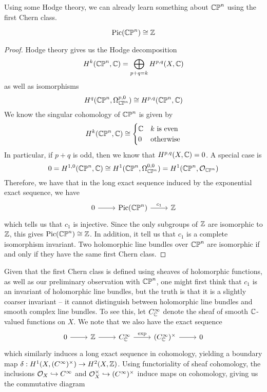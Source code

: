 Using some Hodge theory, we can already learn something about $\mathbb{CP}^n$ using the
first Chern class.
%
\begin{thm}
\[
\mathrm{Pic}(\mathbb{CP}^n) \cong \mathbb{Z}
\]
\end{thm}
%
\begin{proof}
Hodge theory gives us the Hodge decomposition
\[
H^k(\mathbb{CP}^n, \mathbb{C}) = \bigoplus_{p+q=k} H^{p,q}(X, \mathbb{C})
\]
as well as isomorphisms
\[
H^q(\mathbb{CP}^n, \Omega^{p,0}_{\mathbb{CP}^n}) \cong H^{p,q}(\mathbb{CP}^n, \mathbb{C})
\]
We know the singular cohomology of $\mathbb{CP}^n$ is given by
\[
H^k(\mathbb{CP}^n, \mathbb{C}) \cong \begin{cases}
\mathbb{C} & k \text{ is even} \\
0 & \text{otherwise}
\end{cases}
\]
In particular, if $p+q$ is odd, then we know that $H^{p,q}(X,\mathbb{C}) = 0$.
A special case is
\[
0 = H^{1,0}(\mathbb{CP}^n, \mathbb{C}) \cong H^1(\mathbb{CP}^n, \Omega^{0,0}_{\mathbb{CP}^n}) = H^1(\mathbb{CP}^n, \mathcal{O}_{\mathbb{CP}^n})
\]
Therefore, we have that in the long exact sequence induced by the exponential exact
sequence, we have
\[\begin{tikzcd}
0 \ar[r] & \mathrm{Pic}(\CP^n) \ar[r, "c_1"] & \Z
\end{tikzcd}\]
which tells us that $c_1$ is injective. Since the only subgroups of $\mathbb{Z}$
are isomorphic to $\mathbb{Z}$, this gives $\mathrm{Pic}(\mathbb{CP}^n) \cong \mathbb{Z}$. In addition,
it tell us that $c_1$ is a complete isomorphism invariant. Two holomorphic line bundles
over $\mathbb{CP}^n$ are isomorphic if and only if they have the same first Chern class.
\end{proof}
%
Given that the first Chern class is defined using sheaves of holomorphic functions,
as well as our preliminary observation with $\mathbb{CP}^n$, one might first think that $c_1$ is
an invariant of holomorphic line bundles, but the truth is that it is a slightly coarser
invariant -- it cannot distinguish between holomorphic line bundles and smooth complex
line bundles. To see this, let $C^\infty_{\mathbb{C}}$ denote the sheaf of smooth $\mathbb{C}$-valued
functions on $X$. We note that we also have the exact sequence
\[\begin{tikzcd}
0 \ar[r] & \Z \ar[r] & C_\C^\infty \ar[r, "\mathrm{exp}"] & (C_\C^\infty)^\times \ar[r] & 0
\end{tikzcd}\]
which similarly induces a long exact sequence in cohomology, yielding a boundary
map $\delta : H^1(X, (C^\infty)^\times) \to H^2(X, \mathbb{Z})$. Using functoriality
of sheaf cohomology, the inclusions $\mathcal{O}_X \hookrightarrow C^\infty$ and
$\mathcal{O}_X^\times \hookrightarrow (C^\infty)^\times$ induce maps on cohomology, giving
us the commutative diagram
